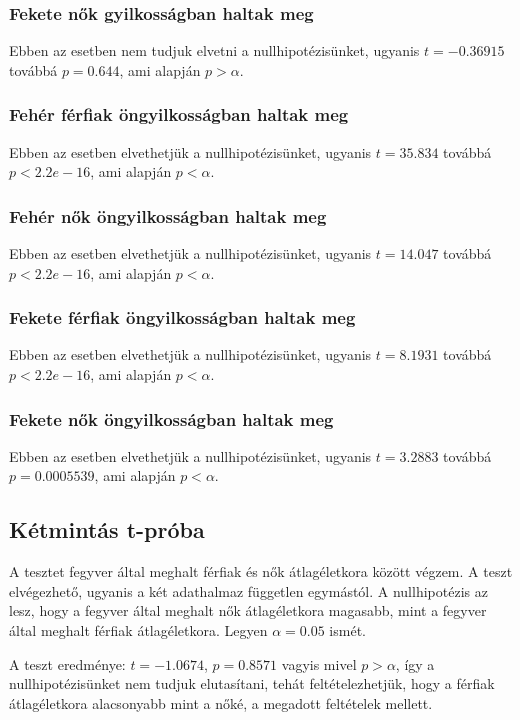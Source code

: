 \documentclass{article}
\begin{document}
\subsubsection{Fekete nők gyilkosságban haltak meg}
Ebben az esetben nem tudjuk elvetni a nullhipotézisünket, ugyanis  $t = -0.36915$ továbbá  $p = 0.644$, ami alapján $p > \alpha$.

\subsubsection{Fehér férfiak öngyilkosságban haltak meg}
Ebben az esetben elvethetjük a nullhipotézisünket, ugyanis  $t = 35.834$ továbbá  $p < 2.2e-16$, ami alapján $p < \alpha$.

\subsubsection{Fehér nők öngyilkosságban haltak meg}
Ebben az esetben elvethetjük a nullhipotézisünket, ugyanis  $t = 14.047$ továbbá  $p < 2.2e-16$, ami alapján $p < \alpha$.

\subsubsection{Fekete férfiak öngyilkosságban haltak meg}
Ebben az esetben elvethetjük a nullhipotézisünket, ugyanis  $t = 8.1931$ továbbá  $p < 2.2e-16$, ami alapján $p < \alpha$.

\subsubsection{Fekete nők öngyilkosságban haltak meg}
Ebben az esetben elvethetjük a nullhipotézisünket, ugyanis  $t = 3.2883$ továbbá  $p = 0.0005539$, ami alapján $p < \alpha$.

\subsection{Kétmintás t-próba}

A tesztet fegyver által meghalt férfiak és nők átlagéletkora között végzem. A teszt elvégezhető, ugyanis a két adathalmaz független egymástól. A nullhipotézis az lesz, hogy a fegyver által meghalt nők átlagéletkora magasabb, mint a fegyver által meghalt férfiak átlagéletkora. Legyen $\alpha = 0.05$ ismét. \par
A teszt eredménye: $t = -1.0674$, $p = 0.8571$ vagyis mivel $p > \alpha$, így a nullhipotézisünket nem tudjuk elutasítani, tehát feltételezhetjük, hogy a férfiak átlagéletkora alacsonyabb mint a nőké, a megadott feltételek mellett.
\end{document}
